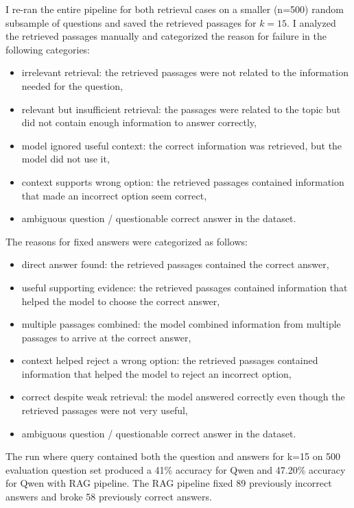 \documentclass{article}
\begin{document}
I re-ran the entire pipeline for both retrieval cases on a smaller (n=500) random subsample of questions 
and saved the retrieved passages for $k=15$. 
I analyzed the retrieved passages manually and categorized the reason for failure in the following categories:
\begin{itemize}
    \item irrelevant retrieval: the retrieved passages were not related to the information needed for the question,
    \item relevant but insufficient retrieval: the passages were related to the topic but did not contain enough information to answer correctly,
    \item model ignored useful context: the correct information was retrieved, but the model did not use it,
    \item context supports wrong option: the retrieved passages contained information that made an incorrect option seem correct,
    \item ambiguous question / questionable correct answer in the dataset.
\end{itemize}

The reasons for fixed answers were categorized as follows:
\begin{itemize}
    \item direct answer found: the retrieved passages contained the correct answer,
    \item useful supporting evidence: the retrieved passages contained information that helped the model to choose the correct answer,
    \item multiple passages combined: the model combined information from multiple passages to arrive at the correct answer,
    \item context helped reject a wrong option: the retrieved passages contained information that helped the model to reject an incorrect option,
    \item correct despite weak retrieval: the model answered correctly even though the retrieved passages were not very useful,
    \item ambiguous question / questionable correct answer in the dataset.
\end{itemize}

The run where query contained both the question and answers for k=15 on 500 evaluation question set produced 
a 41\% accuracy for Qwen and 47.20\% accuracy for Qwen with RAG pipeline. 
The RAG pipeline fixed 89 previously incorrect answers and broke 58 previously correct answers. 
\end{document}

